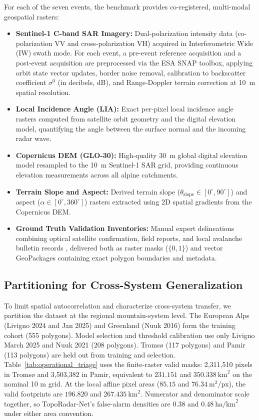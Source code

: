 For each of the seven events, the benchmark provides co-registered, multi-modal geospatial rasters:
\begin{itemize}
    \item \textbf{Sentinel-1 C-band SAR Imagery:} Dual-polarization intensity data (co-polarization VV and cross-polarization VH) acquired in Interferometric Wide (IW) swath mode. For each event, a pre-event reference acquisition and a post-event acquisition are preprocessed via the ESA SNAP toolbox, applying orbit state vector updates, border noise removal, calibration to backscatter coefficient $\sigma^0$ (in decibels, dB), and Range-Doppler terrain correction at 10~m spatial resolution.
    \item \textbf{Local Incidence Angle (LIA):} Exact per-pixel local incidence angle rasters computed from satellite orbit geometry and the digital elevation model, quantifying the angle between the surface normal and the incoming radar wave.
    \item \textbf{Copernicus DEM (GLO-30):} High-quality 30~m global digital elevation model resampled to the 10~m Sentinel-1 SAR grid, providing continuous elevation measurements across all alpine catchments.
    \item \textbf{Terrain Slope and Aspect:} Derived terrain slope ($\theta_{\text{slope}} \in [0^\circ, 90^\circ]$) and aspect ($\alpha \in [0^\circ, 360^\circ]$) rasters extracted using 2D spatial gradients from the Copernicus DEM.
    \item \textbf{Ground Truth Validation Inventories:} Manual expert delineations combining optical satellite confirmation, field reports, and local avalanche bulletin records \citep{avalcd_dataset}, delivered both as raster masks ($\{0, 1\}$) and vector GeoPackages containing exact polygon boundaries and metadata.
\end{itemize}

\subsection{Partitioning for Cross-System Generalization}
\label{sec:data:split}

To limit spatial autocorrelation and characterize cross-system transfer, we partition the dataset at the regional mountain-system level. The European Alps (Livigno 2024 and Jan 2025) and Greenland (Nuuk 2016) form the training cohort (555 polygons). Model selection and threshold calibration use only Livigno March 2025 and Nuuk 2021 (208 polygons). Troms{\o} (117 polygons) and Pamir (113 polygons) are held out from training and selection. Table~\ref{tab:operational_triage} uses the finite-raster valid masks: 2,311,510 pixels in Troms{\o} and 3,503,382 in Pamir, equivalent to $231.151$ and $350.338~\text{km}^2$ on the nominal 10 m grid. At the local affine pixel areas ($85.15$ and $76.34~\text{m}^2/\text{px}$), the valid footprints are $196.820$ and $267.435~\text{km}^2$. Numerator and denominator scale together, so TopoRadar-Net's false-alarm densities are $0.38$ and $0.48~\text{ha/km}^2$ under either area convention.
